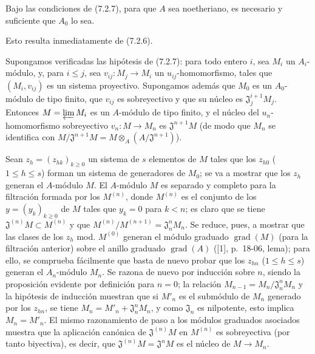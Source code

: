 \begin{corollary}[7.2.8]
\label{0.7.2.8-fr}
Bajo las condiciones de \textup{(7.2.7)}, para que $A$ sea noetheriano, es necesario y
suficiente que $A_0$ lo sea.
\end{corollary}

Esto resulta inmediatamente de (7.2.6).

\begin{proposition}[7.2.9]
\label{0.7.2.9-fr}
Supongamos verificadas las hipótesis de \textup{(7.2.7)}: para todo entero $i$, sea
$M_i$ un $A_i$-módulo, y, para $i\leq j$, sea
$v_{ij}:M_j\to M_i$ un $u_{ij}$-homomorfismo, tales que $(M_i,v_{ij})$ es un
sistema proyectivo. Supongamos además que $M_0$ es un $A_0$-módulo de tipo
finito, que $v_{ij}$ es sobreyectivo y que su núcleo es
$\mathfrak J_j^{i+1}M_j$. Entonces $M=\varprojlim M_i$ es un $A$-módulo de tipo
finito, y el núcleo del $u_n$-homomorfismo sobreyectivo $v_n:M\to M_n$ es
$\mathfrak J^{n+1}M$ \textup{(de modo que $M_n$ se identifica con
$M/\mathfrak J^{n+1}M=M\otimes_A(A/\mathfrak J^{n+1})$)}.
\end{proposition}

Sean $z_h=(z_{hk})_{k\geq0}$ un sistema de $s$ elementos de $M$ tales que los
$z_{h0}$ ($1\leq h\leq s$) forman un sistema de generadores de $M_0$; se va a
mostrar que los $z_h$ generan el $A$-módulo $M$. El $A$-módulo $M$ es
separado y completo para la filtración formada por los $M^{(n)}$, donde $M^{(n)}$
es el conjunto de los $y=(y_k)_{k\geq0}$ de $M$ tales que $y_k=0$ para $k<n$;
es claro que se tiene $\mathfrak J^{(n)}M\subset M^{(n)}$ y que
$M^{(n)}/M^{(n+1)}=\mathfrak J_n^nM_n$. Se reduce, pues, a mostrar que las
clases de los $z_h$ mod. $M^{(0)}$ generan el módulo graduado
$\operatorname{grad}(M)$ (para la filtración anterior) sobre el anillo graduado
$\operatorname{grad}(A)$ ([1], p.~18-06, lema); para ello, se comprueba
fácilmente que basta de nuevo probar que los $z_{hn}$ ($1\leq h\leq s$)
generan el $A_n$-módulo $M_n$. Se razona de nuevo por inducción sobre
$n$, siendo la proposición evidente por definición para $n=0$; la relación
$M_{n-1}=M_n/\mathfrak J_n^nM_n$ y la hipótesis de inducción muestran que si
$M'_n$ es el submódulo de $M_n$ generado por los $z_{hn}$, se tiene
$M_n=M'_n+\mathfrak J_n^nM_n$, y como $\mathfrak J_n$ es nilpotente, esto
implica $M_n=M'_n$. El mismo razonamiento de paso a los módulos graduados
asociados muestra que la aplicación canónica de $\mathfrak J^{(n)}M$ en
$M^{(n)}$ es sobreyectiva (por tanto biyectiva), es decir, que
$\mathfrak J^{(n)}M=\mathfrak J^nM$ es el núcleo de $M\to M_n$.

